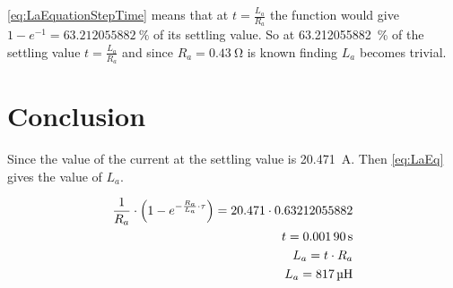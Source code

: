 \autoref{eq:LaEquationStepTime} means that at $t=\frac{L_a}{R_a}$ the function would give $1-e^{-1}=\SI{63.212055882}{\percent}$ of its settling value. So at \SI{63.212055882}{\percent} of the settling value $t=\frac{L_a}{R_a}$ and since $R_a=\SI{0.43}{\ohm}$ \cite{datasheet:saradc} is known finding $L_a$ becomes trivial.

\section*{Conclusion}

Since the value of the current at the settling value is \SI{20.471}{\ampere}. Then \autoref{eq:LaEq} gives the value of $L_a$.

\begin{subequations} \label{eq:LaEq}
	\begin{align}
	\frac{1}{R_a}\cdot \left(1-e^{-\frac{R_a}{L_a}\cdot \tau}\right)=20.471\cdot 0.63212055882 \addunit{\second} \\
	t = \SI{0.00190}{\second} \\
	L_a=t \cdot R_a \\
	L_a=\SI{817}{\micro\henry}
	\end{align}
\end{subequations}
